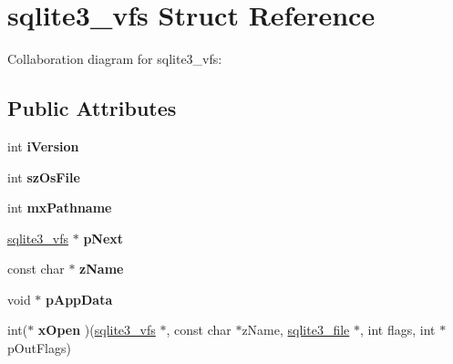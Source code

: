 \hypertarget{structsqlite3__vfs}{\section{sqlite3\+\_\+vfs Struct Reference}
\label{structsqlite3__vfs}
}


Collaboration diagram for sqlite3\+\_\+vfs\+:
\subsection*{Public Attributes}
\begin{DoxyCompactItemize}
\item 
\hypertarget{structsqlite3__vfs_a694dd264949bd163545fe174510ed019}{int {\bfseries i\+Version}}\label{structsqlite3__vfs_a694dd264949bd163545fe174510ed019}

\item 
\hypertarget{structsqlite3__vfs_a549399081342d61134b6398562a0a997}{int {\bfseries sz\+Os\+File}}\label{structsqlite3__vfs_a549399081342d61134b6398562a0a997}

\item 
\hypertarget{structsqlite3__vfs_adb2d82c74891b00b5529fb94e7710135}{int {\bfseries mx\+Pathname}}\label{structsqlite3__vfs_adb2d82c74891b00b5529fb94e7710135}

\item 
\hypertarget{structsqlite3__vfs_a4b12c503e4083854a9c4d91697a12de3}{\hyperlink{structsqlite3__vfs}{sqlite3\+\_\+vfs} $\ast$ {\bfseries p\+Next}}\label{structsqlite3__vfs_a4b12c503e4083854a9c4d91697a12de3}

\item 
\hypertarget{structsqlite3__vfs_a01a82d3e1a7efc00a762a00751ed592b}{const char $\ast$ {\bfseries z\+Name}}\label{structsqlite3__vfs_a01a82d3e1a7efc00a762a00751ed592b}

\item 
\hypertarget{structsqlite3__vfs_a8de686c5e679ba421479ac96d6654527}{void $\ast$ {\bfseries p\+App\+Data}}\label{structsqlite3__vfs_a8de686c5e679ba421479ac96d6654527}

\item 
\hypertarget{structsqlite3__vfs_a5f35d5528d8fdf1d26e1e206879afbe1}{int($\ast$ {\bfseries x\+Open} )(\hyperlink{structsqlite3__vfs}{sqlite3\+\_\+vfs} $\ast$, const char $\ast$z\+Name, \hyperlink{structsqlite3__file}{sqlite3\+\_\+file} $\ast$, int flags, int $\ast$p\+Out\+Flags)}\label{structsqlite3__vfs_a5f35d5528d8fdf1d26e1e206879afbe1}


\end{DoxyCompactItemize}
